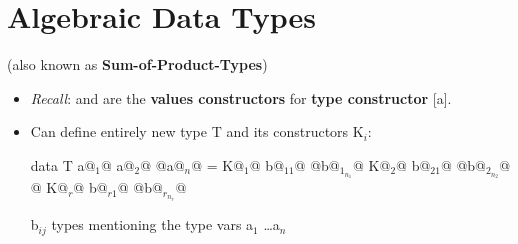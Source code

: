 \newpage
{}




\section{Algebraic Data Types}

(also known as \textbf{Sum-of-Product-Types})

\begin{itemize}
  \item \textit{Recall}: \codeline{[]} and \codeline{(:)} are the \textbf{values constructors} for \textbf{type constructor} [a]. 
  \item Can define entirely new type T and its constructors K$_i$:
        \begin{codebox}[haskell]
data T a@$_1$@ a@$_2$@ @\dots@ a@$_n$@ = K@$_1$@ b@$_{11}$@ @\dots@ b@$_{1_{n_1}}$@
                     K@$_2$@ b@$_{21}$@ @\dots@ b@$_{2_{n_2}}$@
                     @\dots@
                     K@$_r$@ b@$_{r1}$@ @\dots@ b@$_{r_{n_r}}$@
        \end{codebox}
        b$_{ij}$ types mentioning the type vars a$_1$ \dots a$_n$


\end{itemize}
